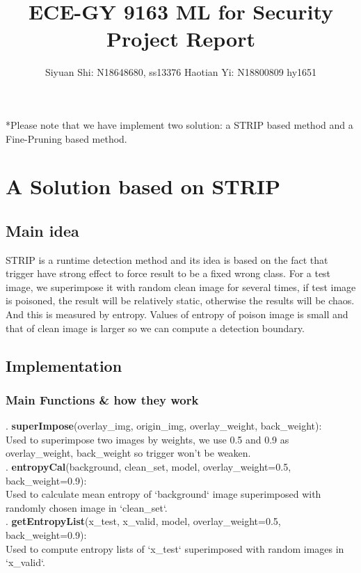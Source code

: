 \documentclass[12pt]{article}
\begin{document}
	\title{ECE-GY 9163 ML for Security Project Report}
	\author{Siyuan Shi: N18648680, ss13376 Haotian Yi: N18800809 hy1651}
	\maketitle
	
	*Please note that we have implement two solution: a STRIP based method and a Fine-Pruning based method.
	
	\section{A Solution based on STRIP}
	\subsection{Main idea}
	
	STRIP is a runtime detection method and its idea is based on the fact that trigger have strong effect to force result to be a fixed wrong class. For a test image, we superimpose it with random clean image for several times, if test image is poisoned, the result will be relatively static, otherwise the results will be chaos. And this is measured by entropy. Values of entropy of poison image is small and that of clean image is larger so we can compute a detection boundary.
	
	\subsection{Implementation}
	
	\subsubsection{Main Functions \& how they work}
	. \textbf{superImpose}(overlay\_img, origin\_img, overlay\_weight, back\_weight):\\
	\indent Used to superimpose two images by weights, we use 0.5 and 0.9 as overlay\_weight, back\_weight so trigger won't be weaken.\\
	
	. \textbf{entropyCal}(background, clean\_set, model, overlay\_weight=0.5, back\_weight=0.9):\\
	\indent Used to calculate mean entropy of `background` image superimposed with randomly chosen image in `clean\_set`.\\
	
	. \textbf{getEntropyList}(x\_test, x\_valid, model, overlay\_weight=0.5, back\_weight=0.9):\\
	\indent Used to compute entropy lists of `x\_test` superimposed with random images in `x\_valid`.\\
	
\end{document}
